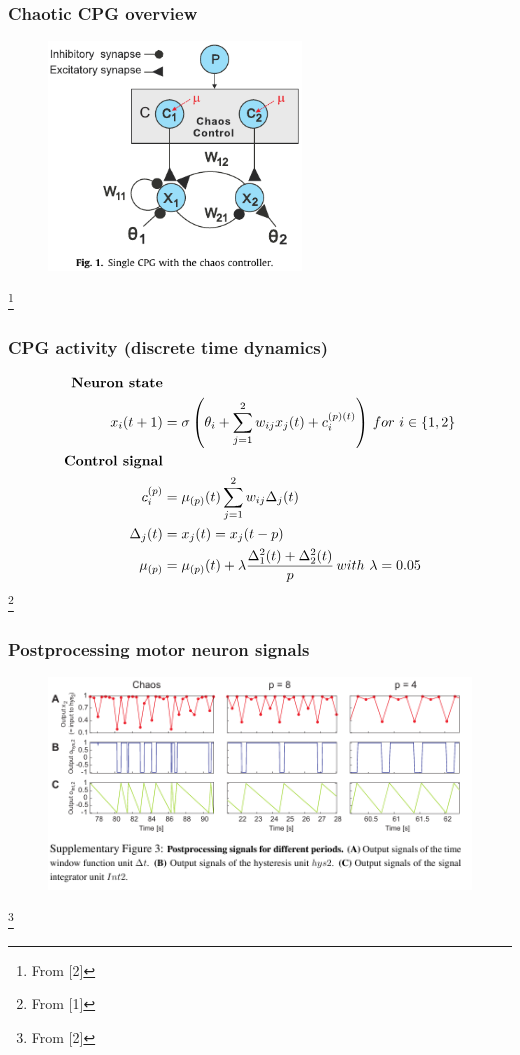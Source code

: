 \documentclass{beamer}
\begin{document}
\begin{frame}
\frametitle{Chaotic CPG overview}
\begin{figure}
\hspace*{-1cm}
\includegraphics[width=0.6\textwidth]{figs/CPG-overview.pdf}
\end{figure}
\footnote{From [2]}
\end{frame}

\begin{frame}
\frametitle{CPG activity (discrete time dynamics)}
\begin{align*}
\text{\textbf{Neuron state}}&\\
x_i(t+1) &= \sigma\left(\theta_i + \sum\limits^2_{j=1}w_{ij} x_j(t) + c_i^{(p)(t)}\right) \, for~i \in \{1,2\}\\
\text{\textbf{Control signal}}&\\
c_i^{(p)} &= \mu_{(p)}(t)\sum\limits^{2}_{j=1}w_{ij}\Delta_j(t)\\
\Delta_j(t) &= x_j(t) = x_j(t-p)\\
\mu_{(p)} &= \mu_{(p)}(t) + \lambda\frac{\Delta^2_1(t) + \Delta^2_2(t)}{p} \, with~\lambda=0.05
\end{align*}
\footnote{From [1]}
\end{frame}


\begin{frame}
\frametitle{Postprocessing motor neuron signals}
\begin{figure}
\center
\includegraphics[width=1\textwidth]{figs/Postprocessing-signals.pdf}
\end{figure}
\footnote{From [2]}
\end{frame}
\end{document}

